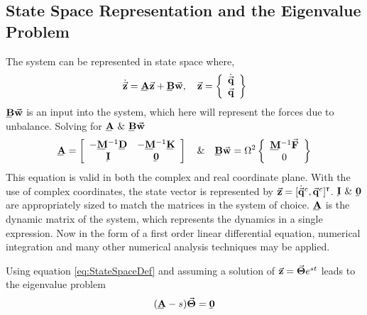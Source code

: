 \subsection{State Space Representation and the Eigenvalue Problem}
The system can be represented in state space where,
\begin{equation}\label{eq:StateSpaceDef}
\dot{\vec{\mathbf{z}}}=\bunderline{\mathbf{A}}\vec{\mathbf{z}}+\bunderline{\mathbf{B}}\vec{\mathbf{w}},\quad\vec{\mathbf{z}}=\left\{\begin{array}{c}\dot{\vec{\mathbf{q}}}\\\vec{\mathbf{q}}\end{array}\right\}
\end{equation}
$ \bunderline{\mathbf{B}}\vec{\mathbf{w}} $ is an input into the system, which here will represent the forces due to unbalance. Solving for $ \bunderline{\mathbf{A}}\  \&\   \bunderline{\mathbf{B}}\vec{\mathbf{w}}$
\begin{equation}\label{key}
\bunderline{\mathbf{A}}=\left[\begin{array}{cc}
-\bunderline{\mathbf{M}}^{-1}\bunderline{\mathbf{D}}&-\bunderline{\mathbf{M}}^{-1}\bunderline{\mathbf{K}}\\
\bunderline{\mathbf{I}}&\bunderline{\mathbf{0}}
\end{array}\right]\quad\&\quad\bunderline{\mathbf{B}}\vec{\mathbf{w}}=\Omega^2\left\{\begin{array}{c}
\mat{M}^{-1}\vec{\mathbf{F}}\\0\end{array}\right\}
\end{equation}
This equation is valid in both the complex and real coordinate plane. With the use of complex coordinates, the state vector is represented by $ \vec{\mathbf{z}}=[\dot{\vec{\mathbf{q}}}^c,\vec{\mathbf{q}}^c]^{\textbf{{\tiny \textsf{T}}}} $. $ \bunderline{\mathbf{I}}\ \&\ \bunderline{\mathbf{0}} $ are appropriately sized to match the matrices in the system of choice. $ \mat{A} $ is the dynamic matrix of the system, which represents the dynamics in a single expression. Now in the form of a first order linear differential equation, numerical integration and many other numerical analysis techniques may be applied.\par
Using equation \eqref{eq:StateSpaceDef} and assuming a solution of $ \vec{\mathbf{z}}=\vec{\mathbf{\Theta}}e^{st} $ leads to the eigenvalue problem
\begin{equation}\label{eq:StateSpaceEigenValueProblem}
(\mat{A}-s)\vect{\Theta}=\mat{0}
\end{equation} 

